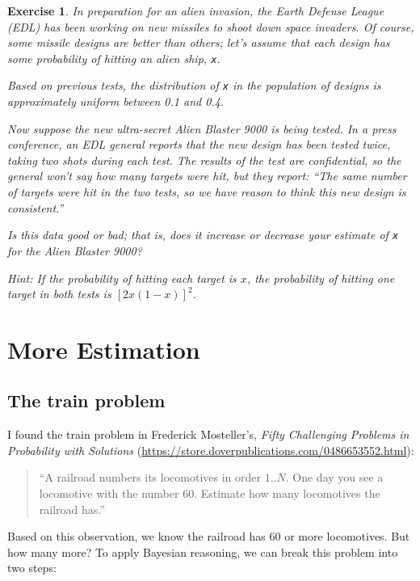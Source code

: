 \documentclass[12pt]{book}
\theoremstyle{exercise}
\newtheorem{exercise}{Exercise}[chapter]
\newcommand{\py}[1]{{\tt #1}}%
\begin{document}
\begin{exercise}
In preparation for an alien invasion, the Earth Defense League (EDL) has been working on new missiles to shoot down space invaders.  Of course, some missile designs are better than others; let's assume that each design has some probability of hitting an alien ship, \py{x}.

Based on previous tests, the distribution of \py{x} in the population of designs is approximately uniform between 0.1 and 0.4.

Now suppose the new ultra-secret Alien Blaster 9000 is being tested.  In a press conference, an EDL general reports that the new design has been tested twice, taking two shots during each test.  The results of the test are confidential, so the general won't say how many targets were hit, but they report: ``The same number of targets were hit in the two tests, so we have reason to think this new design is consistent.''

Is this data good or bad; that is, does it increase or decrease your estimate of \py{x} for the Alien Blaster 9000?

Hint: If the probability of hitting each target is $x$, the probability of hitting one target in both tests is $[2x(1-x)]^2$.
\end{exercise}


\chapter{More Estimation}
\label{estimation}

\section{The train problem}


I found the train problem
in Frederick Mosteller's, {\it Fifty Challenging Problems in
  Probability with Solutions} (\url{https://store.doverpublications.com/0486653552.html}):

\begin{quote}
``A railroad numbers its locomotives in order $1..N$.  One day you see a
locomotive with the number 60.  Estimate how many locomotives the
railroad has.''
\end{quote}

Based on this observation, we know the railroad has 60 or more
locomotives.  But how many more?  To apply Bayesian reasoning, we
can break this problem into two steps:
\end{document}
